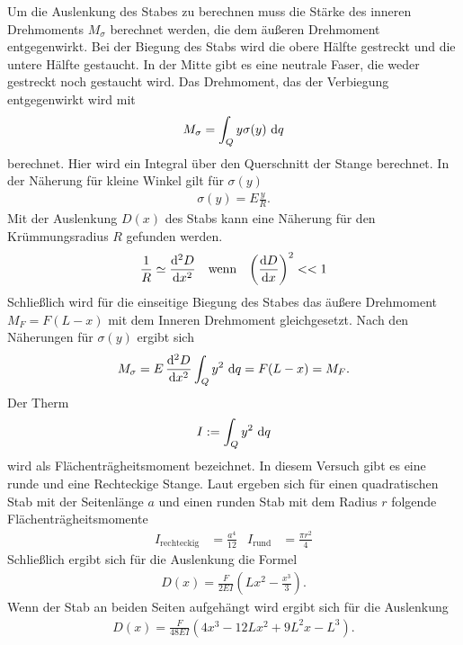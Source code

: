 Um die Auslenkung des Stabes zu berechnen muss die Stärke des inneren Drehmoments $M_\sigma$ berechnet werden, 
die dem äußeren Drehmoment entgegenwirkt.
Bei der Biegung des Stabs wird die obere Hälfte gestreckt und die untere Hälfte gestaucht.
In der Mitte gibt es eine neutrale Faser, die weder gestreckt noch gestaucht wird.
Das Drehmoment, das der Verbiegung entgegenwirkt wird mit 
\begin{align}
    M_\sigma = \int_{Q}^{} y \sigma(y) \,\mathop{}\!\mathrm{d} q 
    \label{eq:inneres_Moment_int}
\end{align}
berechnet.
Hier wird ein Integral über den Querschnitt der Stange berechnet.
In der Näherung für kleine Winkel gilt für $\sigma(y)$
\begin{align*}
    \sigma(y) = E \frac{y}{R} .
\end{align*}
Mit der Auslenkung $D(x)$ des Stabs kann eine Näherung für den Krümmungsradius $R$ gefunden werden.
\begin{align*}
    \frac{1}{R} &\simeq  \frac{\mathop{}\!\mathrm{d}^2 D}{\mathop{}\!\mathrm{d} x^2} & &\text{wenn} & \left(\frac{\mathop{}\!\mathrm{d} D}{\mathop{}\!\mathrm{d} x}\right)^2 << 1 
\end{align*}
Schließlich wird für die einseitige Biegung des Stabes das äußere Drehmoment $M_F = F(L - x)$ mit dem Inneren Drehmoment gleichgesetzt.
Nach den Näherungen für $\sigma(y)$ ergibt sich
\begin{align}
    M_\sigma = E \, \frac{\diff^2 D}{\diff x^2} \int_{Q} y^2 \,\diff q = F (L - x) = M_F  . %
    \label{eq:Momentengleichung_einseitig}
\end{align}
Der Therm 
\begin{align}
    I := \int_{Q} y^2 \,\mathop{}\!\mathrm{d} q
\end{align} 
wird als Flächenträgheitsmoment bezeichnet.
In diesem Versuch gibt es eine runde und eine Rechteckige Stange.
Laut \cite{uni_siegen} ergeben sich für einen quadratischen Stab mit der Seitenlänge $a$ und einen runden Stab mit dem Radius $r$ folgende Flächenträgheitsmomente
\begin{align}
    I_\text{rechteckig} &= \frac{a^4}{12} & I_\text{rund} &= \frac{\pi r^2}{4}
    \label{eq:Flachentragheitsmomente}
\end{align}
%
Schließlich ergibt sich für die Auslenkung die Formel
\begin{align}
    D(x) = \frac{F}{2 E I} \left(L x^2 - \frac{x^3}{3} \right).
    \label{eq:D_x_einseitig}
\end{align}
Wenn der Stab an beiden Seiten aufgehängt wird ergibt sich für die Auslenkung
\begin{align}
    D(x) = \frac{F}{48 E I} \left(4x^3 - 12L x^2 + 9L^2 x - L^3 \right). 
\end{align}